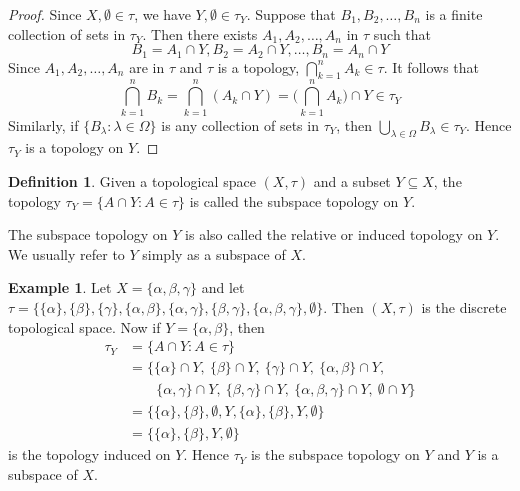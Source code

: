 \documentclass[11pt,a4paper]{article}
\theoremstyle{definition}
\newtheorem{defn}[thm]{Definition}
\newtheorem{exa}[thm]{Example}
\begin{document}
\begin{proof}
Since $X,\emptyset \in \tau$, we have $Y,\emptyset \in \tau_Y$.
Suppose that $B_1,B_2,\ldots,B_n$ is a finite collection of sets in $\tau_Y$. Then there exists $A_1,A_2,\ldots,A_n$ in $\tau$ such that $$B_1=A_1\cap Y, B_2=A_2\cap Y,\ldots,B_n=A_n\cap Y$$ Since $A_1,A_2,\ldots,A_n$ are in $\tau$ and $\tau$ is a topology, $\bigcap^n_{k=1}A_k\in \tau$. It follows that $$\bigcap^n_{k=1}B_k=\bigcap^n_{k=1}(A_k\cap Y)=\Bigg(\bigcap^n_{k=1}A_k\Bigg)\cap Y\in \tau_Y$$
Similarly, if $\{B_{\lambda}:\lambda \in \Omega \}$ is any collection of sets in $\tau_Y$, then $\bigcup_{\lambda \in \Omega} B_{\lambda}\in \tau_Y$. Hence $\tau_Y$ is a topology on $Y$.
\end{proof}






\begin{defn}
Given a topological space $(X,\tau)$ and a subset $Y\subseteq X$, the topology $\tau_Y=\{A\cap Y:A\in \tau \}$ is called the subspace topology on $Y$.

The subspace topology on $Y$ is also called the relative or induced topology on $Y$. We usually refer to $Y$ simply as a subspace of $X$.
\end{defn}





\begin{exa}
Let $X=\{\alpha,\beta,\gamma\}$ and let $\tau =\{\{\alpha \},\{\beta\},\{\gamma\},\{\alpha,\beta\},\{\alpha,\gamma\},\{\beta,\gamma\},\{\alpha,\beta,\gamma\},\emptyset \}$. Then $(X,\tau)$ is the discrete topological space. Now if $Y=\{\alpha,\beta\}$, then
\begin{align*}
\tau_Y &=\{A\cap Y: A\in \tau \}\\
       &=\{\{\alpha\}\cap Y,\ \{\beta\}\cap Y,\ \{\gamma\}\cap Y,\ \{\alpha,\beta\}\cap Y,\\
       &\qquad \{\alpha,\gamma\}\cap Y,\ \{\beta,\gamma\}\cap Y,\ \{\alpha,\beta,\gamma\}\cap Y,\ \emptyset \cap Y\}\\
       &=\{\{\alpha\},\{\beta\},\emptyset,Y,\{\alpha\},\{\beta\},Y,\emptyset\}\\
       &=\{\{\alpha\},\{\beta\},Y,\emptyset\}
\end{align*}
is the topology induced on $Y$. Hence $\tau_Y$ is the subspace topology on $Y$ and $Y$ is a subspace of $X$.
\end{exa}
\end{document}
